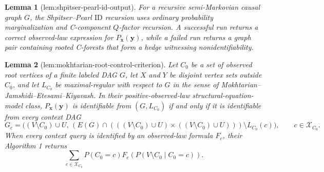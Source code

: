 \documentclass{article}
\newtheorem{lemma}{Lemma}
\begin{document}
\begin{lemma}[lem:shpitser-pearl-id-output]\label{lem:shpitser-pearl-id-output}
For a recursive semi-Markovian causal graph \(G\), the Shpitser--Pearl \(\mathrm{ID}\) recursion uses ordinary probability marginalization and C-component \(Q\)-factor recursion. A successful run returns a correct observed-law expression for \(P_{\mathbf x}(\mathbf y)\), while a failed run returns a graph pair containing rooted C-forests that form a hedge witnessing nonidentifiability.
\end{lemma}

\begin{lemma}[lem:mokhtarian-root-control-criterion]\label{lem:mokhtarian-root-control-criterion}
Let \(C_0\) be a set of observed root vertices of a finite labeled DAG \(G\), let \(X\) and \(Y\) be disjoint vertex sets outside \(C_0\), and let \(L_{C_0}\) be maximal-regular with respect to \(G\) in the sense of Mokhtarian--Jamshidi--Etesami--Kiyavash. In their positive-observed-law structural-equation-model class, \(P_{\mathbf x}(\mathbf y)\) is identifiable from \((G,L_{C_0})\) if and only if it is identifiable from every context DAG
\[
G_c=\bigl((V\setminus C_0)\cup U,\, (E(G)\cap(((V\setminus C_0)\cup U)\times((V\setminus C_0)\cup U)))\setminus L_{C_0}(c)\bigr),
\qquad c\in\mathcal X_{C_0}.
\]
When every context query is identified by an observed-law formula \(F_c\), their Algorithm 1 returns
\[
\sum_{c\in\mathcal X_{C_0}}P(C_0=c)F_c\!\left(P(V\setminus C_0\mid C_0=c)\right).
\]
\end{lemma}
\end{document}

